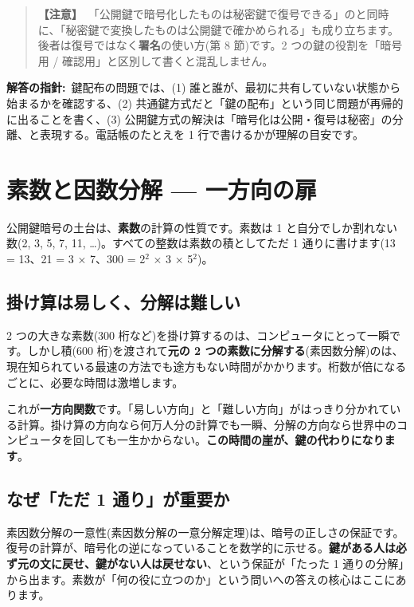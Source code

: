 \documentclass{article}
\begin{document}
\begin{quote}
\textbf{【注意】}\ 「公開鍵で暗号化したものは秘密鍵で復号できる」のと同時に、「秘密鍵で変換したものは公開鍵で確かめられる」も成り立ちます。後者は復号ではなく\textbf{署名}の使い方(第 8 節)です。2 つの鍵の役割を「暗号用 / 確認用」と区別して書くと混乱しません。
\end{quote}

\textbf{解答の指針:}\ 鍵配布の問題では、(1) 誰と誰が、最初に共有していない状態から始まるかを確認する、(2) 共通鍵方式だと「鍵の配布」という同じ問題が再帰的に出ることを書く、(3) 公開鍵方式の解決は「暗号化は公開・復号は秘密」の分離、と表現する。電話帳のたとえを 1 行で書けるかが理解の目安です。

\section{素数と因数分解 — 一方向の扉}

公開鍵暗号の土台は、\textbf{素数}の計算の性質です。素数は 1 と自分でしか割れない数(2, 3, 5, 7, 11, …)。すべての整数は素数の積としてただ 1 通りに書けます(13 = 13、21 = 3 × 7、300 = 2\(^{2}\) × 3 × 5\(^{2}\))。

\subsection{掛け算は易しく、分解は難しい}

2 つの大きな素数(300 桁など)を掛け算するのは、コンピュータにとって一瞬です。しかし積(600 桁)を渡されて\textbf{元の 2 つの素数に分解する}(素因数分解)のは、現在知られている最速の方法でも途方もない時間がかかります。桁数が倍になるごとに、必要な時間は激増します。

これが\textbf{一方向関数}です。「易しい方向」と「難しい方向」がはっきり分かれている計算。掛け算の方向なら何万人分の計算でも一瞬、分解の方向なら世界中のコンピュータを回しても一生かからない。\textbf{この時間の崖が、鍵の代わりになります}。

\subsection{なぜ「ただ 1 通り」が重要か}

素因数分解の一意性(素因数分解の一意分解定理)は、暗号の正しさの保証です。復号の計算が、暗号化の逆になっていることを数学的に示せる。\textbf{鍵がある人は必ず元の文に戻せ、鍵がない人は戻せない}、という保証が「たった 1 通りの分解」から出ます。素数が「何の役に立つのか」という問いへの答えの核心はここにあります。
\end{document}
